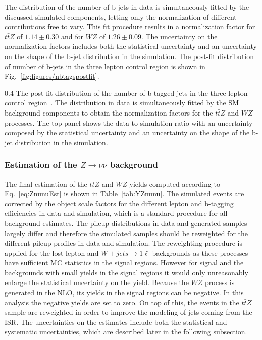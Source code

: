 The distribution of the number of b-jets in data is simultaneously fitted by the discussed simulated components, letting only the normalization of different contributions free to vary. This fit procedure results in a normalization factor for $t\bar{t}Z$ of $1.14 \pm 0.30$ and for $WZ$ of $1.26 \pm 0.09$. The uncertainty on the normalization factors includes both the statistical uncertainty and an uncertainty on the shape of the b-jet distribution in the simulation. The post-fit distribution of number of b-jets in the three lepton control region is shown in Fig.~\ref{fig:figures/nbtagspostfit}.

                 {0.4}       %
                 { The post-fit distribution of the number of b-tagged jets in the three lepton control region~\cite{Sirunyan:2017uyt}. The distribution in data is simultaneously fitted by the SM background components to obtain the normalization factors for the $t\bar{t}Z$ and $WZ$ processes. The top panel shows the data-to-simulation ratio with an uncertainty composed by the statistical uncertainty and an uncertainty on the shape of the b-jet distribution in the simulation.  }

\subsubsection{Estimation of the $Z \to \nu \bar{\nu}$ background }

The final estimation of the $t\bar{t}Z$ and $WZ$ yields computed according to Eq.~\ref{eq:ZnunuEst} is shown in Table~\ref{tab:YZnunu}. The simulated events are corrected by the object scale factors for the different lepton and b-tagging efficiencies in data and simulation, which is a standard procedure for all background estimates. The  pileup distributions in data and  generated samples largely differ and therefore the simulated samples should be reweighted for the different pileup profiles in data and simulation. The reweighting procedure is applied for the lost lepton and $W+jets \to 1\ell$ backgrounds as these processes have sufficient MC statistics in the signal regions. However for signal and the backgrounds with small yields in the signal regions it would only unreasonably enlarge the statistical uncertainty on the yield.   Because the $WZ$ process is generated in the NLO, its yields in the signal regions can be negative. In this analysis the negative yields are set to zero. On top of this, the events in the $t\bar{t}Z$ sample are reweighted in order to improve the modeling of jets coming from the ISR. The uncertainties on the estimates include both the statistical and systematic uncertainties, which are described later in the following subsection.


